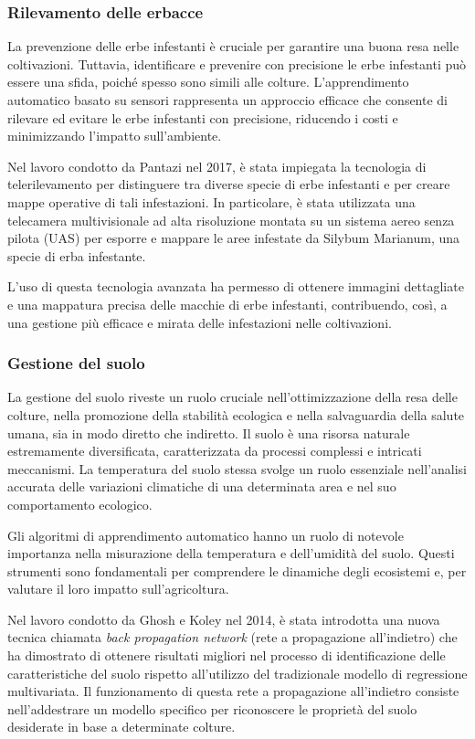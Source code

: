 \subsubsection{Rilevamento delle erbacce}

La prevenzione delle erbe infestanti è cruciale per garantire una buona resa nelle coltivazioni. Tuttavia, identificare e prevenire con precisione le erbe infestanti può essere una sfida, poiché spesso sono simili alle colture. L'apprendimento automatico basato su sensori rappresenta un approccio efficace che consente di rilevare ed evitare le erbe infestanti con precisione, riducendo i costi e minimizzando l'impatto sull'ambiente.

Nel lavoro condotto da Pantazi nel 2017, è stata impiegata la tecnologia di telerilevamento per distinguere tra diverse specie di erbe infestanti e per creare mappe operative di tali infestazioni. In particolare, è stata utilizzata una telecamera multivisionale ad alta risoluzione montata su un sistema aereo senza pilota (UAS) per esporre e mappare le aree infestate da Silybum Marianum, una specie di erba infestante.

L'uso di questa tecnologia avanzata ha permesso di ottenere immagini dettagliate e una mappatura precisa delle macchie di erbe infestanti, contribuendo, così, a una gestione più efficace e mirata delle infestazioni nelle coltivazioni.

\subsubsection{Gestione del suolo}

La gestione del suolo riveste un ruolo cruciale nell'ottimizzazione della resa delle colture, nella promozione della stabilità ecologica e nella salvaguardia della salute umana, sia in modo diretto che indiretto. Il suolo è una risorsa naturale estremamente diversificata, caratterizzata da processi complessi e intricati meccanismi. La temperatura del suolo stessa svolge un ruolo essenziale nell'analisi accurata delle variazioni climatiche di una determinata area e nel suo comportamento ecologico.

Gli algoritmi di apprendimento automatico hanno un ruolo di notevole importanza nella misurazione della temperatura e dell'umidità del suolo. Questi strumenti sono fondamentali per comprendere le dinamiche degli ecosistemi e, per valutare il loro impatto sull'agricoltura.

Nel lavoro condotto da Ghosh e Koley nel 2014, è stata introdotta una nuova tecnica chiamata \textit{back propagation network} (rete a propagazione all'indietro) che ha dimostrato di ottenere risultati migliori nel processo di identificazione delle caratteristiche del suolo rispetto all'utilizzo del tradizionale modello di regressione multivariata. Il funzionamento di questa rete a propagazione all'indietro consiste nell'addestrare un modello specifico per riconoscere le proprietà del suolo desiderate in base a determinate colture.

